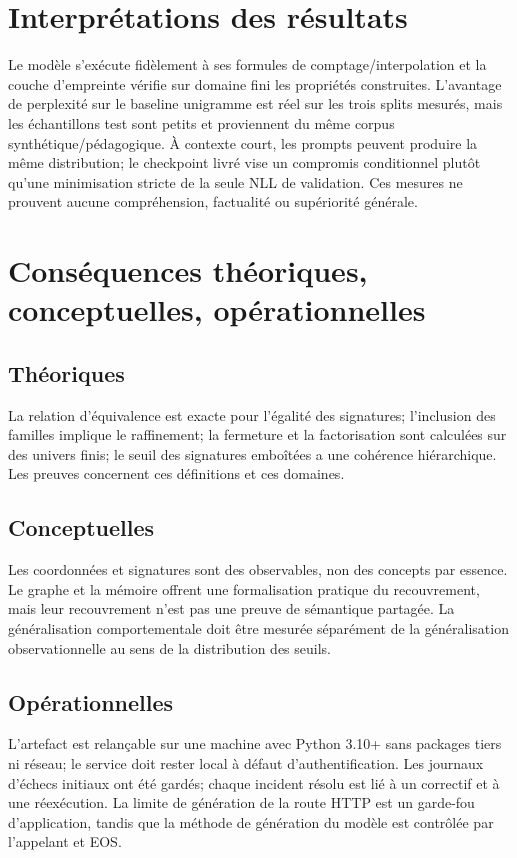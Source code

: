 \documentclass[11pt,a4paper]{article}
\begin{document}
\section{Interprétations des résultats}
Le modèle s'exécute fidèlement à ses formules de comptage/interpolation et la couche d'empreinte vérifie sur domaine fini les propriétés construites. L'avantage de perplexité sur le baseline unigramme est réel sur les trois splits mesurés, mais les échantillons test sont petits et proviennent du même corpus synthétique/pédagogique. À contexte court, les prompts peuvent produire la même distribution; le checkpoint livré vise un compromis conditionnel plutôt qu'une minimisation stricte de la seule NLL de validation. Ces mesures ne prouvent aucune compréhension, factualité ou supériorité générale.
\section{Conséquences théoriques, conceptuelles, opérationnelles}
\subsection{Théoriques}
La relation d'équivalence est exacte pour l'égalité des signatures; l'inclusion des familles implique le raffinement; la fermeture et la factorisation sont calculées sur des univers finis; le seuil des signatures emboîtées a une cohérence hiérarchique. Les preuves concernent ces définitions et ces domaines.
\subsection{Conceptuelles}
Les coordonnées et signatures sont des observables, non des concepts par essence. Le graphe et la mémoire offrent une formalisation pratique du recouvrement, mais leur recouvrement n'est pas une preuve de sémantique partagée. La généralisation comportementale doit être mesurée séparément de la généralisation observationnelle au sens de la distribution des seuils.
\subsection{Opérationnelles}
L'artefact est relançable sur une machine avec Python 3.10+ sans packages tiers ni réseau; le service doit rester local à défaut d'authentification. Les journaux d'échecs initiaux ont été gardés; chaque incident résolu est lié à un correctif et à une réexécution. La limite de génération de la route HTTP est un garde-fou d'application, tandis que la méthode de génération du modèle est contrôlée par l'appelant et EOS.
\end{document}
